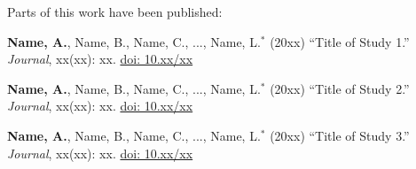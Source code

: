 \documentclass[crop=false]{standalone}
\begin{document}
\thispagestyle{empty}
\vspace*{\fill}
\noindent Parts of this work have been published:
\vspace*{1\baselineskip}

\noindent \textbf{Name, A.}, Name, B., Name, C., ..., Name, L.$^{*}$ (20xx) \enquote{Title of Study 1.} \textit{Journal}, xx(xx): xx. \href{https://doi.org/10.xx/xx}{doi: 10.xx/xx}
\vspace*{0.5\baselineskip}

\noindent \textbf{Name, A.}, Name, B., Name, C., ..., Name, L.$^{*}$ (20xx) \enquote{Title of Study 2.} \textit{Journal}, xx(xx): xx. \href{https://doi.org/10.xx/xx}{doi: 10.xx/xx}
\vspace*{0.5\baselineskip}

\noindent \textbf{Name, A.}, Name, B., Name, C., ..., Name, L.$^{*}$ (20xx) \enquote{Title of Study 3.} \textit{Journal}, xx(xx): xx. \href{https://doi.org/10.xx/xx}{doi: 10.xx/xx}
\vspace*{0.5\baselineskip}

\vspace*{2\baselineskip}
\end{document}
